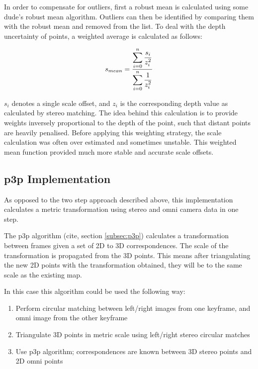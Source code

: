 In order to compensate for outliers, first a robust mean is calculated using some dude's robust mean algorithm.  Outliers can then be identified by comparing them with the robust mean and removed from the list. To deal with the depth uncertainty of points, a weighted average is calculated as follows:

\begin{equation}
\centering
s_{mean} = \dfrac{\displaystyle\sum\limits_{i=0}^n{\dfrac{s_i}{z_i^2}}}
{\displaystyle\sum\limits_{i=0}^n{\dfrac{1}{z_i^2}}}
\end{equation}

$s_i$ denotes a single scale offset, and $z_i$ is the corresponding depth value as calculated by stereo matching.  The idea behind this calculation is to provide weights inversely proportional to the depth of the point, such that distant points are heavily penalised.  Before applying this weighting strategy, the scale calculation was often over estimated and sometimes unstable.  This weighted mean function provided much more stable and accurate scale offsets.



\subsection{p3p Implementation}

As opposed to the two step approach described above, this implementation calculates a metric transformation using stereo and omni camera data in one step.

The p3p algorithm (cite, section \ref{subsec:p3p}) calculates a transformation between frames given a set of 2D to 3D correspondences.  The scale of the transformation is propagated from the 3D points.  This means after triangulating the new 2D points with the transformation obtained, they will be to the same scale as the existing map.

In this case this algorithm could be used the following way:

\begin{enumerate}
\itemsep0em
 \item Perform circular matching between left/right images from one keyframe, and omni image from the other keyframe
 \item Triangulate 3D points in metric scale using left/right stereo circular matches
 \item Use p3p algorithm; correspondences are known between 3D stereo points and 2D omni points
\end{enumerate}

